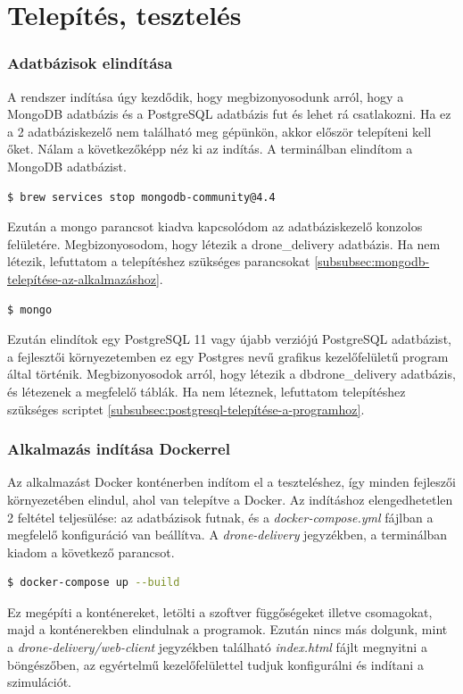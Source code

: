 \section{Telepítés, tesztelés}
\subsubsection{Adatbázisok elindítása}
A rendszer indítása úgy kezdődik, hogy megbizonyosodunk arról, hogy a MongoDB adatbázis és a PostgreSQL adatbázis fut és lehet rá csatlakozni.
Ha ez a 2 adatbáziskezelő nem található meg gépünkön, akkor először telepíteni kell őket.
Nálam a következőképp néz ki az indítás. A terminálban elindítom a MongoDB adatbázist.
\begin{lstlisting}[language=bash]
  $ brew services stop mongodb-community@4.4
\end{lstlisting}

Ezután a mongo parancsot kiadva kapcsolódom az adatbáziskezelő konzolos felületére.
Megbizonyosodom, hogy létezik a drone\_delivery adatbázis.
Ha nem létezik, lefuttatom a telepítéshez szükséges parancsokat \ref{subsubsec:mongodb-telepítése-az-alkalmazáshoz}.
\begin{lstlisting}[language=bash]
  $ mongo
\end{lstlisting}


Ezután elindítok egy PostgreSQL 11 vagy újabb verziójú PostgreSQL adatbázist, a fejlesztői környezetemben ez egy Postgres nevű grafikus kezelőfelületű program által történik.
Megbizonyosodok arról, hogy létezik a dbdrone\_delivery adatbázis, és létezenek a megfelelő táblák. Ha nem léteznek, lefuttatom telepítéshez szükséges scriptet \ref{subsubsec:postgresql-telepítése-a-programhoz}.

\subsubsection{Alkalmazás indítása Dockerrel}
Az alkalmazást Docker konténerben indítom el a teszteléshez, így minden fejleszői környezetében elindul, ahol van telepítve a Docker.
Az indításhoz elengedhetetlen 2 feltétel teljesülése: az adatbázisok futnak, és a \textit{docker-compose.yml} fájlban a megfelelő konfiguráció van beállítva.
A \textit{drone-delivery} jegyzékben, a terminálban kiadom a következő parancsot.
\begin{lstlisting}[language=bash]
  $ docker-compose up --build
\end{lstlisting}

Ez megépíti a konténereket, letölti a szoftver függőségeket illetve csomagokat, majd a konténerekben elindulnak a programok.
Ezután nincs más dolgunk, mint a \textit{drone-delivery/web-client} jegyzékben található \textit{index.html} fájlt megnyitni a böngészőben, az egyértelmű kezelőfelülettel tudjuk konfigurálni és indítani a szimulációt.

